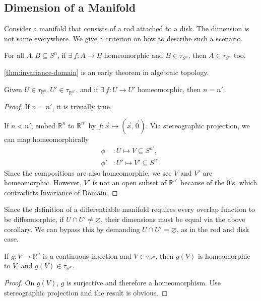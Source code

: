 \documentclass[../main.tex]{subfiles}
\begin{document}
    \subsection{Dimension of a Manifold}
    \begin{remark}
        Consider a manifold that consists of a rod attached to a disk. The dimension 
        is not same everywhere. We give a criterion on how to describe 
        such a scenario.
    \end{remark}
    \begin{theorem}\label{thm:invariance-domain}
        For all \(A, B \subseteq S^n\), if \(\exists~f : A \to B\) homeomorphic 
        and \(B \in \tau_{S^n}\), then \(A \in \tau_{S^n}\) too.
    \end{theorem}
    \begin{remark}
        \cref{thm:invariance-domain} is an early theorem in algebraic topology.
    \end{remark}
    \begin{corollary}\label{cor:manifold-dim-well-defined}
        Given \(U \in \tau_{\mathbb{R}^n}, U' \in \tau_{\mathbb{R}^{n'}}\), and if 
        \(\exists~f : U \to U'\) homeomorphic, then \(n = n'\).
    \end{corollary}
    \begin{proof}
        If \(n = n'\), it is trivially true. \par
        If \(n < n'\), embed \(\mathbb{R}^n\) to \(\mathbb{R}^{n'}\) by 
        \(f : \vec{x} \mapsto (\vec{x}, \vec{0})\). Via stereographic projection, 
        we can map homeomorphically
        \[
        \begin{aligned}
            \phi &: U  \mapsto V \subseteq S^{n'}, \\
            \phi'&: U' \mapsto V' \subseteq S^{n'}.
        \end{aligned}
        \]
        Since the compositions are also homeomorphic, we see \(V\) and \(V'\) are 
        homeomorphic. However, \(V'\) is not an open subset of \(\mathbb{R}^{n'}\) because 
        of the \(0\)'s, which contradicts Invariance of Domain. 
    \end{proof}
    \begin{remark}
        Since the definition of a differentiable manifold requires every overlap 
        function to be diffeomorphic, if \(U \cap U' \neq \varnothing\), their 
        dimensions must be equal via the above corollary. We can bypass this by 
        demanding \(U \cap U' = \varnothing\), as in the rod and disk case.
    \end{remark}
    \newpage
    \begin{corollary}\label{cor:injection-homeomorphism}
        If \(g : V \to \mathbb{R}^n\) is a continuous injection and \(V \in 
        \tau_{\mathbb{R}^n}\), then \(g(V)\) is homeomorphic to \(V\), and 
        \(g(V) \in \tau_{\mathbb{R}^n}\).
    \end{corollary}
    \begin{proof}
        On \(g(V)\), \(g\) is surjective and therefore a homeomorphism. Use 
        stereographic projection and the result is obvious.
    \end{proof}
\end{document}
